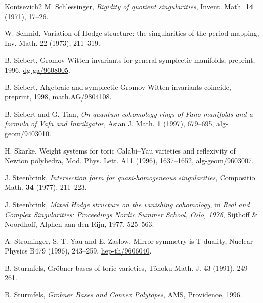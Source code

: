 \begin{thebibliography}{Kontsevich2}
\hypertarget{bib:Schlessinger}{} M. Schlessinger, \emph{Rigidity of quotient singularities}, Invent. Math. \textbf{14} (1971), 17--26.

\hypertarget{bib:Schmid}{}
W. Schmid, Variation of Hodge structure: the singularities of the period mapping,
Inv. Math. 22 (1973), 211--319.

\hypertarget{bib:Siebert1}{}
B. Siebert, Gromov-Witten invariants for general symplectic manifolds, preprint, 1996, \href{https://arxiv.org/abs/dg-ga/9608005}{dg-ga/9608005}.

\hypertarget{bib:Siebert2}{}
B. Siebert, Algebraic and symplectic Gromov-Witten invariants coincide, preprint, 1998, \href{https://arxiv.org/abs/math.AG/9804108}{math.AG/9804108}.

\hypertarget{bib:ST}{} B. Siebert and G. Tian, \emph{On quantum cohomology rings of Fano manifolds and a formula of Vafa and Intriligator}, Asian J. Math. \textbf{1} (1997), 679--695, \href{https://arxiv.org/abs/alg-geom/9403010}{alg-geom/9403010}.

\hypertarget{bib:Skarke}{}
H. Skarke, Weight systems for toric Calabi--Yau varieties and reflexivity of Newton
polyhedra, Mod. Phys. Lett. A11 (1996), 1637--1652, \href{https://arxiv.org/abs/alg-geom/9603007}{alg-geom/9603007}.

\hypertarget{bib:Steenbrink1}{} J. Steenbrink, \emph{Intersection form for quasi-homogeneous singularities}, Compositio Math. \textbf{34} (1977), 211--223.

\hypertarget{bib:Steenbrink2}{} J. Steenbrink, \emph{Mixed Hodge structure on the vanishing cohomology}, in \emph{Real and Complex Singularities: Proceedings Nordic Summer School, Oslo, 1976}, Sijthoff \& Noordhoff, Alphen aan den Rijn, 1977, 525--563.

\hypertarget{bib:SYZ}{}
A. Strominger, S.-T. Yau and E. Zaslow,
Mirror symmetry is T-duality,
Nuclear Physics B479 (1996), 243--259, \href{https://arxiv.org/abs/hep-th/9606040}{hep-th/9606040}.

\hypertarget{bib:Sturmfels1}{}
B. Sturmfels, Gröbner bases of toric varieties, Tôhoku Math. J. 43 (1991), 249--261.

\hypertarget{bib:Sturmfels2}{} B. Sturmfels, \emph{Gröbner Bases and Convex Polytopes}, AMS, Providence, 1996.


\end{thebibliography}
